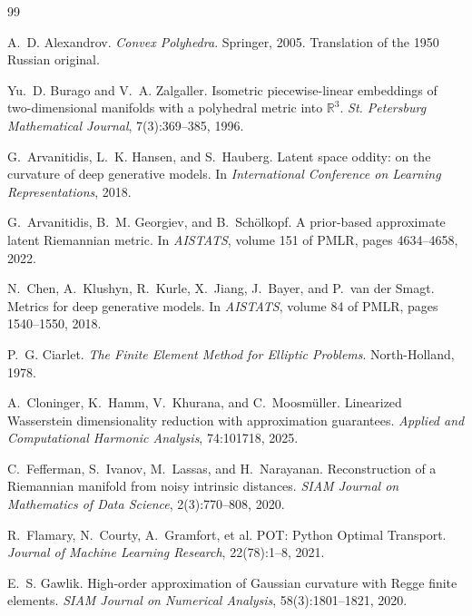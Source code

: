 \raggedbottom
\begin{thebibliography}{99}
\small
\setlength{\itemsep}{0.35em}
\setlength{\parskip}{0pt}

A.~D. Alexandrov.
\newblock \emph{Convex Polyhedra}.
\newblock Springer, 2005.  Translation of the 1950 Russian original.

Yu.~D. Burago and V.~A. Zalgaller.
\newblock Isometric piecewise-linear embeddings of two-dimensional manifolds
with a polyhedral metric into $\mathbb R^3$.
\newblock \emph{St. Petersburg Mathematical Journal}, 7(3):369--385, 1996.

G.~Arvanitidis, L.~K. Hansen, and S.~Hauberg.
\newblock Latent space oddity: on the curvature of deep generative models.
\newblock In \emph{International Conference on Learning Representations}, 2018.

G.~Arvanitidis, B.~M. Georgiev, and B.~Sch\"olkopf.
\newblock A prior-based approximate latent Riemannian metric.
\newblock In \emph{AISTATS}, volume 151 of PMLR, pages 4634--4658, 2022.

N.~Chen, A.~Klushyn, R.~Kurle, X.~Jiang, J.~Bayer, and P.~van der Smagt.
\newblock Metrics for deep generative models.
\newblock In \emph{AISTATS}, volume 84 of PMLR, pages 1540--1550, 2018.

P.~G. Ciarlet.
\newblock \emph{The Finite Element Method for Elliptic Problems}.
\newblock North-Holland, 1978.

A.~Cloninger, K.~Hamm, V.~Khurana, and C.~Moosm\"uller.
\newblock Linearized Wasserstein dimensionality reduction with approximation
guarantees.
\newblock \emph{Applied and Computational Harmonic Analysis}, 74:101718, 2025.

C.~Fefferman, S.~Ivanov, M.~Lassas, and H.~Narayanan.
\newblock Reconstruction of a Riemannian manifold from noisy intrinsic
distances.
\newblock \emph{SIAM Journal on Mathematics of Data Science}, 2(3):770--808,
2020.

R.~Flamary, N.~Courty, A.~Gramfort, et al.
\newblock POT: Python Optimal Transport.
\newblock \emph{Journal of Machine Learning Research}, 22(78):1--8, 2021.

E.~S. Gawlik.
\newblock High-order approximation of Gaussian curvature with Regge finite
elements.
\newblock \emph{SIAM Journal on Numerical Analysis}, 58(3):1801--1821, 2020.


\end{thebibliography}
